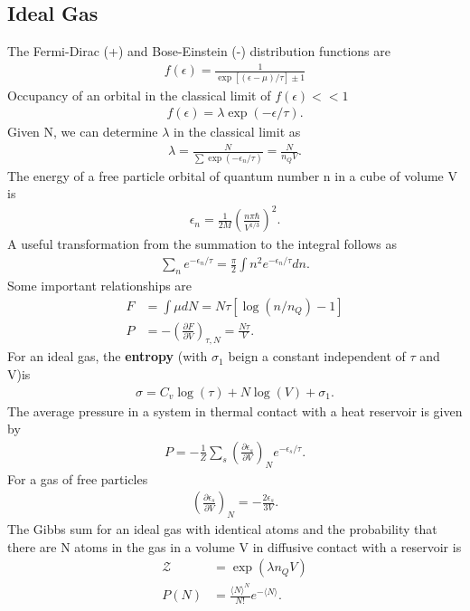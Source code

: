 \begin{multicols}{2}
	\section{Ideal Gas}
	The Fermi-Dirac (+) and Bose-Einstein (-) distribution functions are
	\begin{align}
	f(\epsilon) = \frac{1}{\exp[(\epsilon-\mu)/\tau]\pm 1}
	\end{align}
	Occupancy of an orbital in the classical limit of $f(\epsilon) << 1$
	\begin{align}
	f(\epsilon) = \lambda \exp(-\epsilon/\tau).
	\end{align}
	Given N, we can determine $\lambda$ in the classical limit as
	\begin{align}
	\lambda = \frac{N}{\sum \exp(-\epsilon_n/\tau)} = \frac{N}{n_Q V}.
	\end{align}
	The energy of a free particle orbital of quantum number n in a cube of volume V is
	\begin{align}
	\epsilon_n = \frac{1}{2M}\left(\frac{n \pi \hbar}{V^{1/3}}\right)^2.
	\end{align}
	A useful transformation from the summation to the integral follows as
	\begin{align}
	\sum_n e^{-\epsilon_n/\tau} = \frac{\pi}{2}\int n^2 e^{-\epsilon_n/\tau} dn.
	\end{align}
	Some important relationships are
	\begin{align}
	F &= \int \mu dN = N\tau[\log(n/n_Q)-1] \\
	P&= -\left(\frac{\partial F}{\partial V}\right)_{\tau,N} = \frac{N\tau}{V}.
	\end{align}
	For an ideal gas, the \textbf{entropy} (with $\sigma_1$ beign a constant independent of $\tau$ and V)is
	\begin{align}
	\sigma = C_v \log(\tau)+N\log(V)+\sigma_1.
	\end{align}
	The average pressure in a system in thermal contact with a heat reservoir is given by 
	\begin{align}
	P= -\frac{1}{Z}\sum_s \left(\frac{\partial \epsilon_s}{\partial  V}\right)_N e^{-\epsilon_s/\tau}.
	\end{align}
	For a gas of free particles
	\begin{align}
	\left(\frac{\partial \epsilon_s}{\partial  V}\right)_N = -\frac{2\epsilon_s}{3V}.
	\end{align}
	The Gibbs sum for an ideal gas with identical atoms and the probability that there are N atoms in the gas in a volume V in diffusive contact with a reservoir is
	\begin{align}
	\mathcal{Z} &= \exp(\lambda n_Q V) \\
	P(N) &= \frac{\langle N \rangle^N}{N!} e^{-\langle N \rangle}.
	\end{align}
\end{multicols}